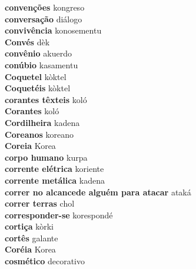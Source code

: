\textbf{ convenções  } kongreso \\
\textbf{ conversação  } diálogo \\
\textbf{ convivência  } konosementu \\
\textbf{ Convés  } dèk \\
\textbf{ convênio  } akuerdo \\
\textbf{ conúbio  } kasamentu \\
\textbf{ Coquetel  } kòktel \\
\textbf{ Coquetéis  } kòktel \\
\textbf{ corantes têxteis  } koló \\
\textbf{ Corantes  } koló \\
\textbf{ Cordilheira  } kadena \\
\textbf{ Coreanos  } koreano \\
\textbf{ Coreia  } Korea \\
\textbf{ corpo humano  } kurpa \\
\textbf{ corrente elétrica  } koriente \\
\textbf{ corrente metálica  } kadena \\
\textbf{ correr no alcancede alguém para atacar  } ataká \\
\textbf{ correr terras  } chol \\
\textbf{ corresponder-se  } korespondé \\
\textbf{ cortiça  } kòrki \\
\textbf{ cortês  } galante \\
\textbf{ Coréia  } Korea \\
\textbf{ cosmético  } decorativo \\
